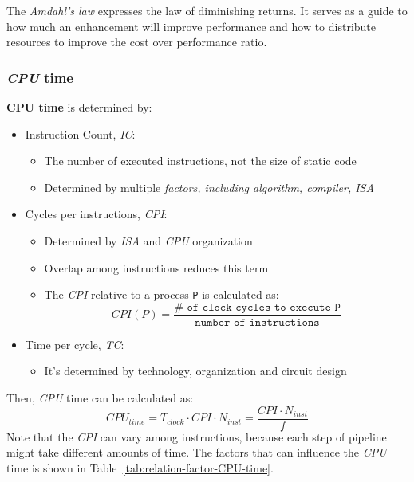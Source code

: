 \documentclass[english]{article}
\begin{document}

The \textit{Amdahl's law} expresses the law of diminishing returns.
It serves as a guide to how much an enhancement will improve performance and how to distribute resources to improve the cost over performance ratio.

\subsubsection{\textit{CPU} time}

\textbf{CPU time} is determined by:

\begin{itemize}
  \item Instruction Count, \textit{IC}:
        \begin{itemize}
          \item The number of executed instructions, not the size of static code
          \item Determined by multiple \textit{factors, including algorithm, compiler, ISA}
        \end{itemize}
  \item Cycles per instructions, \textit{CPI}:
        \begin{itemize}
          \item Determined by \textit{ISA} and \textit{CPU} organization
          \item Overlap among instructions reduces this term
          \item The \textit{CPI} relative to a process \texttt{P} is calculated as:
                \[ CPI(P) = \dfrac{\texttt{\#\ of\ clock\ cycles\ to\ execute\ P}}{\texttt{number\ of\ instructions}} \]
        \end{itemize}
  \item Time per cycle, \textit{TC}:
        \begin{itemize}
          \item It's determined by technology, organization and circuit design
        \end{itemize}
\end{itemize}

\bigskip
Then, \textit{CPU} time can be calculated as:
\[ CPU_{time} = T_{clock} \cdot CPI \cdot N_{inst} = \dfrac{CPI \cdot N_{inst}}{f} \]
Note that the \textit{CPI} can vary among instructions, because each step of pipeline might take different amounts of time.
The factors that can influence the \textit{CPU} time is shown in Table~\ref{tab:relation-factor-CPU-time}.
\end{document}
